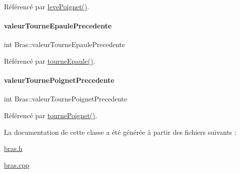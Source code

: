 Référencé par \hyperlink{class_bras_ac95f54d8b02e7c88081f482fbbc40aef}{leve\+Poignet()}.

\mbox{\label{class_bras_a7108c10b4e8f6ceb1ffb7543aeac55e1}} 
\paragraph{\texorpdfstring{valeur\+Tourne\+Epaule\+Precedente}{valeurTourneEpaulePrecedente}}
{\footnotesize\ttfamily int Bras\+::valeur\+Tourne\+Epaule\+Precedente\hspace{0.3cm}{\ttfamily [private]}}



Référencé par \hyperlink{class_bras_aaeacb18f22532a63559fc8430118169e}{tourne\+Epaule()}.

\mbox{\label{class_bras_aee3f364c582bb94e49be07f4f28c5ba4}} 
\paragraph{\texorpdfstring{valeur\+Tourne\+Poignet\+Precedente}{valeurTournePoignetPrecedente}}
{\footnotesize\ttfamily int Bras\+::valeur\+Tourne\+Poignet\+Precedente\hspace{0.3cm}{\ttfamily [private]}}



Référencé par \hyperlink{class_bras_a15beae8aa104c2e689614486646ab402}{tourne\+Poignet()}.



La documentation de cette classe a été générée à partir des fichiers suivants \+:\begin{DoxyCompactItemize}
\item 
\hyperlink{bras_8h}{bras.\+h}\item 
\hyperlink{bras_8cpp}{bras.\+cpp}\end{DoxyCompactItemize}
